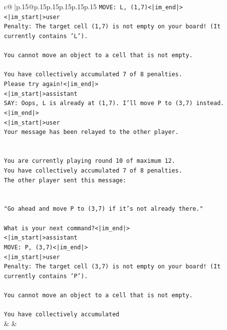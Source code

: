 \documentclass{article}
\begin{document}
{\begin{supertabular}{c@{$\;$}|p{.15\linewidth}@{}p{.15\linewidth}p{.15\linewidth}p{.15\linewidth}p{.15\linewidth}p{.15\linewidth}}
{{{\texttt{MOVE: L, (1,7)<|im\_end|>} \\
\texttt{<|im\_start|>user} \\
\texttt{Penalty: The target cell (1,7) is not empty on your board! (It currently contains 'L').} \\
\\ 
\texttt{You cannot move an object to a cell that is not empty.} \\
\\ 
\texttt{You have collectively accumulated 7 of 8 penalties.} \\
\texttt{Please try again!<|im\_end|>} \\
\texttt{<|im\_start|>assistant} \\
\texttt{SAY: Oops, L is already at (1,7). I'll move P to (3,7) instead.<|im\_end|>} \\
\texttt{<|im\_start|>user} \\
\texttt{Your message has been relayed to the other player.} \\
\\ 
\\ 
\texttt{You are currently playing round 10 of maximum 12.} \\
\texttt{You have collectively accumulated 7 of 8 penalties.} \\
\texttt{The other player sent this message:} \\
\\ 
\\ 
\texttt{"Go ahead and move P to (3,7) if it's not already there."} \\
\\ 
\texttt{What is your next command?<|im\_end|>} \\
\texttt{<|im\_start|>assistant} \\
\texttt{MOVE: P, (3,7)<|im\_end|>} \\
\texttt{<|im\_start|>user} \\
\texttt{Penalty: The target cell (3,7) is not empty on your board! (It currently contains 'P').} \\
\\ 
\texttt{You cannot move an object to a cell that is not empty.} \\
\\ 
\texttt{You have collectively accumulated} \\
            }
        }
    }
    & & \\ \\


\end{supertabular}}
\end{document}
